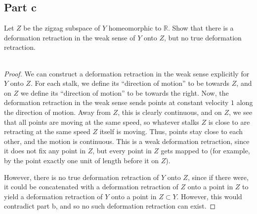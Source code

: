 \documentclass[fontsize=11pt]{scrartcl} %
\numberwithin{equation}{section} %
\numberwithin{figure}{section} %
\numberwithin{table}{section} %
\newcommand{\R}{\mathbb{R}}
\begin{document}
\subsection*{Part c}
Let $Z$ be the zigzag subspace of $Y$ homeomorphic to $\R$. Show that there is a
deformation retraction in the weak sense of $Y$ onto $Z$, but no true
deformation retraction. 
\\
\\
\begin{proof}
     We can construct a deformation retraction in the weak sense explicitly for
     $Y$ onto $Z$. For each stalk, we define its ``direction of motion'' to be
     towards $Z$, and on $Z$ we define its ``direction of motion'' to be towards
     the right. Now, the deformation retraction in the weak sense sends points
     at constant velocity $1$ along the direction of motion. Away from $Z$, this
     is clearly continuous, and on $Z$, we see that all points are moving at the
     same speed, so whatever stalks $Z$ is close to are retracting at the same
     speed $Z$ itself is moving. Thus, points stay close to each other, and the
     motion is continuous. This is a weak deformation retraction, since it does
     not fix any point in $Z$, but every point in $Z$ gets mapped to (for
     example, by the point exactly one unit of length before it on $Z$). 

     However, there is no true deformation retraction of $Y$ onto $Z$, since if
     there were, it could be concatenated with a deformation retraction of $Z$
     onto a point in $Z$ to yield a deformation retraction of $Y$ onto a point
     in $Z\subset Y$. However, this would contradict part b, and so no such
     deformation retraction can exist.
\end{proof}

\newpage
\end{document}
